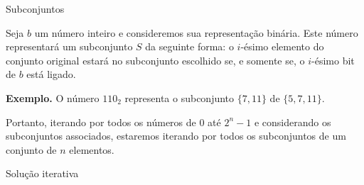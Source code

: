 \begin{frame}{Subconjuntos}


    Seja $b$ um número inteiro e consideremos sua representação binária. Este número representará um subconjunto $S$ da seguinte forma: o $i$-ésimo elemento do conjunto original estará no subconjunto escolhido se, e somente se, o $i$-ésimo bit de $b$ está ligado. \pause

    {\bf Exemplo.} O número $110_2$ representa o subconjunto $\{7, 11\}$ de $\{5,  7, 11\}$. \pause

    Portanto, iterando por todos os números de $0$ até $2^n -1$ e considerando os subconjuntos associados, estaremos iterando por todos os subconjuntos de um conjunto de $n$ elementos. \pause

    \begin{block}{Solução iterativa}
        \footnotesize
        \inputminted{cpp}{codigos/subsets-iterativo.cpp}    
    \end{block}

\end{frame}

